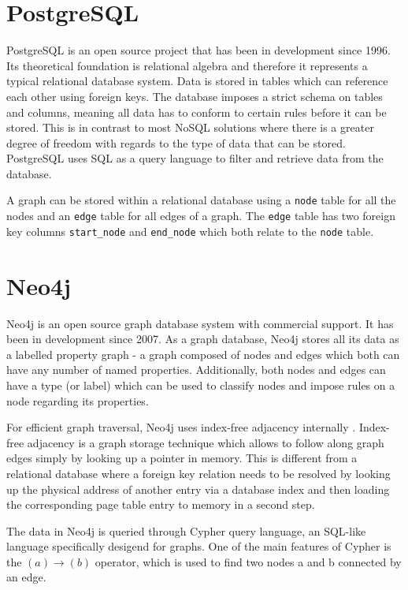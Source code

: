 \documentclass[11pt, a4paper,oneside,chapterprefix=false]{scrbook}
\begin{document}
\section{PostgreSQL}
PostgreSQL \cite{postgres} is an open source project that has been in development since 1996.
Its theoretical foundation is relational algebra \cite{relationalalgebra} and therefore it represents a typical relational database system.
Data is stored in tables which can reference each other using foreign keys.
The database imposes a strict schema on tables and columns, meaning all data has to conform to certain rules before it can be stored.
This is in contrast to most NoSQL solutions where there is a greater degree of freedom with regards to the type of data that can be stored.
PostgreSQL uses SQL as a query language to filter and retrieve data from the database.

A graph can be stored within a relational database using a \lstinline{node} table for all the nodes and an \lstinline{edge} table for all edges of a graph. 
The \lstinline{edge} table has two foreign key columns \lstinline{start_node} and \lstinline{end_node} which both relate to the \lstinline{node} table.

\section{Neo4j}
Neo4j \cite{neo4j} is an open source graph database system with commercial support.
It has been in development since 2007.
As a graph database, Neo4j stores all its data as a labelled property graph - a graph composed of nodes and edges which both can have any number of named properties.
Additionally, both nodes and edges can have a type (or label) which can be used to classify nodes and impose rules on a node regarding its properties.

For efficient graph traversal, Neo4j uses index-free adjacency internally \cite{neo4jinaction:chapter11}.
Index-free adjacency is a graph storage technique which allows to follow along graph edges simply by looking up a pointer in memory.
This is different from a relational database where a foreign key relation needs to be resolved by looking up the physical address of another entry via a database index and then loading the corresponding page table entry to memory in a second step.

The data in Neo4j is queried through Cypher query language, an SQL-like language specifically desigend for graphs.
One of the main features of Cypher is the $(a)\rightarrow(b)$ operator, which is used to find two nodes a and b connected by an edge.
\end{document}
